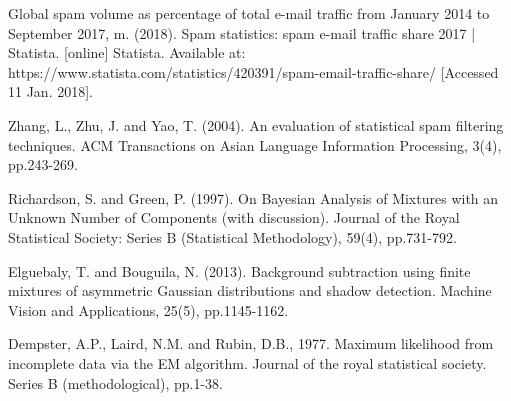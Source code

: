 \documentclass[conference]{IEEEtran}
\begin{document}
\begin{thebibliography}{[MT1]}
 Global spam volume as percentage of total e-mail traffic from January 2014 to September 2017, m. (2018). Spam statistics: spam e-mail traffic share 2017 | Statista. [online] Statista. Available at: https://www.statista.com/statistics/420391/spam-email-traffic-share/ [Accessed 11 Jan. 2018].

 Zhang, L., Zhu, J. and Yao, T. (2004). An evaluation of statistical spam filtering techniques. ACM Transactions on Asian Language Information Processing, 3(4), pp.243-269.







 Richardson, S. and Green, P. (1997). On Bayesian Analysis of Mixtures with an Unknown Number of Components (with discussion). Journal of the Royal Statistical Society: Series B (Statistical Methodology), 59(4), pp.731-792.

 Elguebaly, T. and Bouguila, N. (2013). Background subtraction using finite mixtures of asymmetric Gaussian distributions and shadow detection. Machine Vision and Applications, 25(5), pp.1145-1162.

 Dempster, A.P., Laird, N.M. and Rubin, D.B., 1977. Maximum likelihood from incomplete data via the EM algorithm. Journal of the royal statistical society. Series B (methodological), pp.1-38.


\end{thebibliography}
\end{document}
